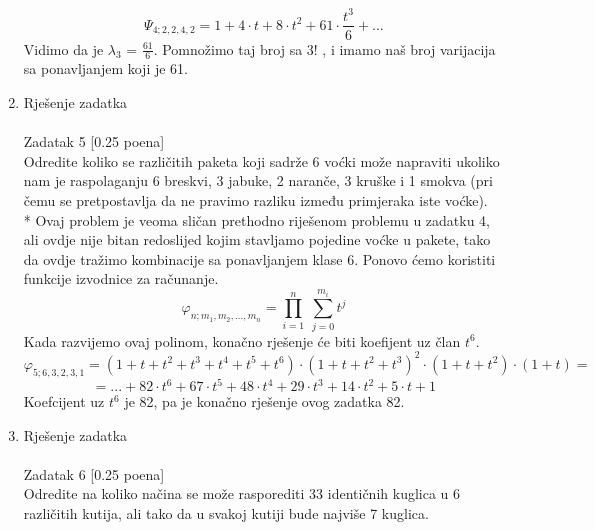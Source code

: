 \documentclass[12pt]{article}
\begin{document}
\begin{enumerate}
\begin{equation*}
   \Psi_{4;2,2,4,2} = 1 + 4 \cdot t + 8 \cdot t^2 + 61 \cdot \frac{t^3}{6} + ...
\end{equation*}
Vidimo da je ${\lambda_3}$ = {$\frac{61}{6}$}. Pomnožimo taj broj sa 3! , i imamo naš broj varijacija sa ponavljanjem koji je 61.
        
		\item Rješenje zadatka \\
		\\
		Zadatak 5 [0.25 poena] \\
		
Odredite koliko se različitih paketa koji sadrže 6 voćki može napraviti ukoliko
nam je raspolaganju 6 breskvi, 3 jabuke, 2 naranče, 3 kruške i 1 smokva (pri
čemu se pretpostavlja da ne pravimo razliku između primjeraka iste voćke). \\

* Ovaj problem je veoma sličan prethodno riješenom problemu u zadatku
4, ali ovdje nije bitan redoslijed kojim stavljamo pojedine voćke u pakete,
tako da ovdje tražimo kombinacije sa ponavljanjem klase 6. Ponovo ćemo
koristiti funkcije izvodnice za računanje.
\begin{equation*}
   \varphi_{n;m_1,m_2,...,m_n} = \prod_{i=1}^{n} ~ \sum_{j=0}^{m_i} t^j
\end{equation*}	
Kada razvijemo ovaj polinom, konačno rješenje će biti koefijent uz član
$t^6$.
\begin{equation*}
   \varphi_{5;6,3,2,3,1} = (1+t+t^2+t^3+t^4+t^5+t^6) \cdot (1+t+t^2+t^3)^2 \cdot (1+t+t^2) \cdot (1+t) =
\end{equation*}	
\begin{equation*}
    = ... + 82 \cdot t^6 + 67 \cdot t^5 + 48 \cdot t^4 + 29 \cdot t^3 + 14 \cdot t^2 + 5 \cdot t + 1
\end{equation*}	
Koefcijent uz $t^6$ je 82, pa je konačno rješenje ovog zadatka 82.
		\newpage
		\item Rješenje zadatka \\
		\\
		Zadatak 6 [0.25 poena] \\
		
Odredite na koliko načina se može rasporediti 33 identičnih kuglica u 6
različitih kutija, ali tako da u svakoj kutiji bude najviše 7 kuglica. \\


\end{enumerate}
\end{document}
